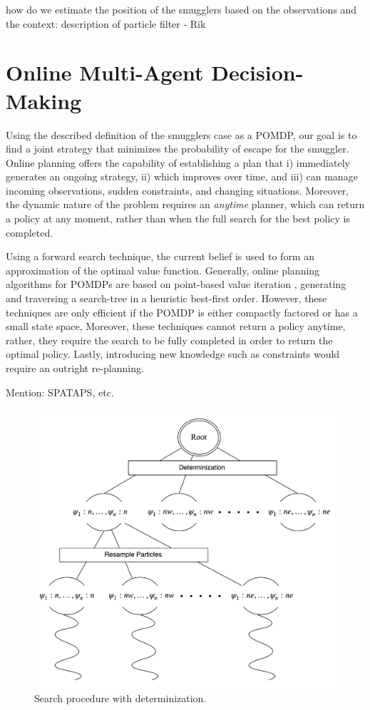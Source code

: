 \documentclass[conference]{IEEEtran}
\begin{document}
{\red how do we estimate the position of the smugglers based on the observations and the context: description of particle filter - Rik}

\section{Online Multi-Agent Decision-Making}
\label{sec:ma-dec-mak}

Using the described definition of the smugglers case as a POMDP, our goal is to find a joint strategy that minimizes the probability of escape for the smuggler. Online planning offers the capability of establishing a plan that i) immediately generates an ongoing strategy, ii) which improves over time, and iii) can manage incoming observations, sudden constraints, and changing situations. Moreover, the dynamic nature of the problem requires an {\it anytime} planner, which can return a policy at any moment, rather than when the full search for the best policy is completed.

Using a forward search technique, the current belief is used to form an approximation of the optimal value function. Generally, online planning algorithms for POMDPs are based on point-based value iteration \cite{pineau2006anytime,ross2008online}, generating and traversing a search-tree in a heuristic best-first order. However, these techniques are only efficient if the POMDP is either compactly factored or has a small state space, Moreover, these techniques cannot return a policy anytime, rather, they require the search to be fully completed in order to return the optimal policy. Lastly, introducing new knowledge such as constraints would require an outright re-planning.

{\red Mention: SPATAPS, etc.}

\begin{figure}
\begin{center}
 \includegraphics[width=.45\textwidth]{img/searchtree.png}
 \caption{Search procedure with determinization.}\label{fig:searchtree}
\end{center}
\end{figure}
\end{document}
